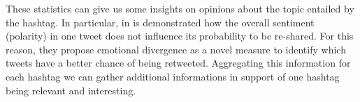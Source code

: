 These statistics can give us some insights on opinions about the topic entailed by the hashtag.
In particular, in \cite{DBLP:conf:icwsm:PfitznerGS12}  is demonstrated how the overall sentiment (polarity) in one tweet does not influence its probability to be re-shared.
For this reason, they propose emotional divergence as a novel measure to identify which tweets have a better chance of being retweeted.
Aggregating this information for each hashtag we can gather additional informations in support of one hashtag being relevant and interesting.




